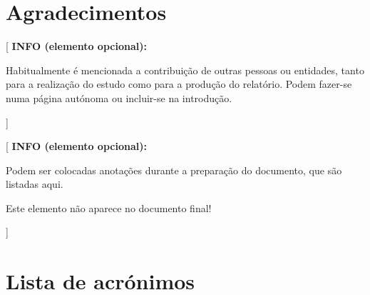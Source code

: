 \documentclass[11pt,a4paper]{report}
\newenvironment{infoopt}[1]{\vspace*{6mm}\color{blue}[ \textbf{INFO (elemento opcional):} \begin{em} #1}{\vspace*{3mm}\end{em} ]}
\begin{document}


\acresetall %


\chapter*{Agradecimentos}

\begin{infoopt}
Habitualmente é mencionada a contribuição de outras pessoas ou
entidades, tanto para a realização do estudo como para a produção do
relatório. 
Podem fazer-se numa página autónoma ou incluir-se na introdução.
\end{infoopt}


\renewcommand{\contentsname}{Índice}

\tableofcontents


\listoftodos

\begin{infoopt}
Podem ser colocadas anotações durante a preparação do documento, que
são listadas aqui.

Este elemento não aparece no documento final!
\end{infoopt}


\chapter*{Lista de acrónimos}


\begin{acronym}[123456] %
\end{acronym}
\end{document}
